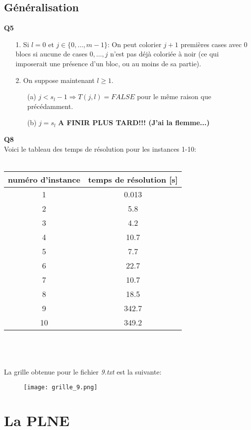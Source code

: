 \documentclass[10pt,a4paper]{article}
\begin{document}
\subsection{Généralisation}
\noindent\textbf{Q5} \\
\begin{itemize}
	\item[1.] Si $l = 0$ et $j \in \lbrace 0, \hdots, m-1 \rbrace$: On peut colorier $j+1$ premières cases avec 0 blocs si aucune de cases $0, \hdots, j$ n'est pas déjà coloriée à noir (ce qui imposerait une présence d'un bloc, ou au moins de sa partie). \\
	\item[2.] On suppose maintenant $l \geq 1$.
	\begin{itemize}
		\item[(a)] $j < s_l - 1 \Rightarrow T(j,l) = FALSE $ pour le même raison que précédamment.
		\item[(b)] $j = s_l$ \textbf{A FINIR PLUS TARD!!! (J'ai la flemme...)}
	\end{itemize}
\end{itemize}
\noindent 
\textbf{Q8}
\\
\noindent
Voici le tableau des temps de résolution pour les instances 1-10: \\ \\
\begin{tabular}{|c|c|}
\hline
numéro d'instance & temps de résolution [s]\\
\hline
\hline
1  & 0.013\\
\hline
2 & 5.8\\
\hline
3 & 4.2\\
\hline
4 & 10.7\\
\hline
5 & 7.7\\
\hline
6 & 22.7\\
\hline
7 & 10.7\\
\hline
8 & 18.5\\
\hline
9 & 342.7\\
\hline
10 & 349.2\\
\hline
\end{tabular} 
\\ \\ \\
\noindent
La grille obtenue pour le fichier \textit{9.txt} est la suivante:

\begin{figure}[H]
\texttt{[image: grille\_9.png]}
\end{figure} 
\newpage
\section{La PLNE}
\end{document}
